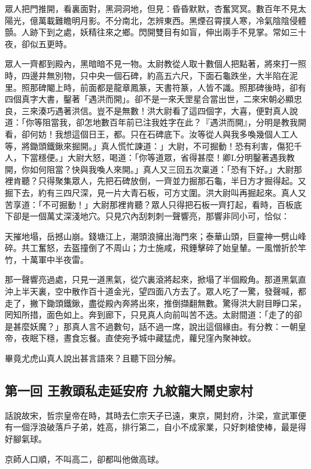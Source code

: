 \documentclass[11pt,a4paper]{article}
\begin{document}
眾人把門推開，看裏面對，黑洞洞地，但見：昏昏默默，杏奮冥冥。數百年不見太陽光，億萬載難瞻明月影。不分南北，怎辨東西。黑煙召霄撲人寒，冷氣陰陰侵體顫。人跡下到之處，妖精往來之鄉。閃開雙目有如盲，伸出兩手不見掌。常如三十夜，卻似五更時。

眾人一齊都到殿內，黑暗暗不見一物。太尉教從人取十數個人把點著，將來打一照時，四邊井無別物，只中央一個石碑，約高五六尺，下面石龜跌坐，大半陷在泥里。照那碑閹上時，前面都是龍章鳳篆，天書符篆，人皆不識。照那碑後時，卻有四個真字大書，鑿著「遇洪而開」。卻不是一來夭罡星合當出世，二來宋朝必顯忠良，三來湊巧遇著洪信。豈不是無數！洪大尉看了這四個字，大喜，便對真人說道：「你等阻當我，卻怎地數百年前已注我姓字在此？『遇洪而開』，分明是教我開看，卻何妨！我想這個日王，都。只在石碑底下。汝等從人與我多喚幾個人工人等，將鋤頭鐵鍬來掘開。」真人慌忙諫道：」大尉，不可掘動！恐有利害，傷犯千人，下當穩便。」大尉大怒，喝道：「你等道眾，省得甚麼！卿L分明鑿著遇我教開，你如何阻當？快與我喚人來開。」真人又三回五次稟道：「恐有下好。」大尉那裡肯聽？只得聚集眾人，先把石碑放倒，一齊並力掘那石龜，半日方才掘得起。又掘下去，約有三四尺深，見一片大青石板，可方丈圍。洪大尉叫再掘起來。真人又苦享道：「不可掘動！」大尉那裡肯聽？眾人只得把石板一齊打起，看時，百板底下卻是一個萬丈深淺地穴。只見穴內刮刺刺一聲響亮，那響非同小可，恰似：

天摧地塌，岳撼山崩。錢塘江上，潮頭浪擁出海門來；泰華山頭，巨靈神一劈山峰碎。共工奮怒，去盔撞倒了不周山；力士施咸，飛錘擊碎了始皇輦。一風憎折於竿竹，十萬軍中半夜雷。

那一聲響亮過處，只見一道黑氣，從穴裏滾將起來，掀塌了半個殿角。那道黑氣直沖上半天裏，空中散作百十道金光，望四面八方去了。眾人吃了一驚，發聲喊，都走了，撇下鋤頭鐵鍬，盡從殿內奔將出來，推倒擷翻無數。驚得洪大尉目睜口呆，罔知所措，面色如上。奔到廊下，只見真人向前叫苦不迭。太尉間道：「走了的卻是甚麼妖魔？」那真人言不過數句，話不過一席，說出這個緣由。有分教：一朝皇帝，夜眠下穩，晝食忘餐。直使宛予城中藏猛虎，蘿兒窪內聚神蚊。

畢竟尤虎山真人說出甚言語來？且聽下回分解。

\subsection{第一回 王教頭私走延安府 九紋龍大鬧史家村}

話說故宋，哲宗皇帝在時，其時去仁宗天子已遠，東京，開封府，汴梁，宣武軍便有一個浮浪破落戶子弟，姓高，排行第二，自小不成家業，只好刺槍使棒，最是得好腳氣球。

京師人口順，不叫高二，卻都叫他做高球。
\end{document}
